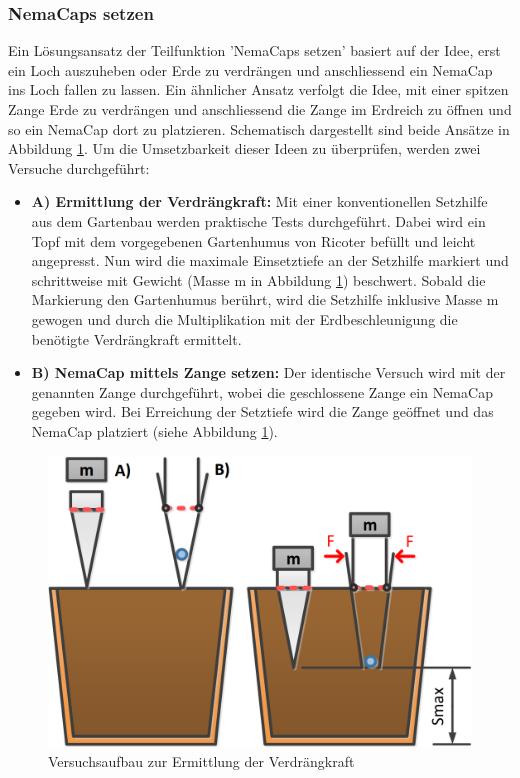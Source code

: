 \subsubsection{NemaCaps setzen}
Ein Lösungsansatz der Teilfunktion 'NemaCaps setzen' basiert auf der Idee, erst ein Loch auszuheben oder Erde zu verdrängen und anschliessend ein NemaCap ins Loch fallen zu lassen. Ein ähnlicher Ansatz verfolgt die Idee, mit einer spitzen Zange Erde zu verdrängen und anschliessend die Zange im Erdreich zu öffnen und so ein NemaCap dort zu platzieren. Schematisch dargestellt sind beide Ansätze in Abbildung \ref{fig:skizze_setzversuch}.
\newline
Um die Umsetzbarkeit dieser Ideen zu überprüfen, werden zwei Versuche durchgeführt:
\begin{itemize}
	\item \textbf{A) Ermittlung der Verdrängkraft:} Mit einer konventionellen Setzhilfe aus dem Gartenbau werden praktische Tests durchgeführt. Dabei wird ein Topf mit dem vorgegebenen Gartenhumus von Ricoter befüllt und leicht angepresst. Nun wird die maximale Einsetztiefe an der Setzhilfe markiert und schrittweise mit Gewicht (Masse m in Abbildung \ref{fig:skizze_setzversuch}) beschwert. Sobald die Markierung den Gartenhumus berührt, wird die Setzhilfe inklusive Masse m gewogen und durch die Multiplikation mit der Erdbeschleunigung die benötigte Verdrängkraft ermittelt.
	
	\item \textbf{B) NemaCap mittels Zange setzen:} Der identische Versuch wird mit der genannten Zange durchgeführt, wobei die geschlossene Zange ein NemaCap gegeben wird. Bei Erreichung der Setztiefe wird die Zange geöffnet und das NemaCap platziert (siehe Abbildung \ref{fig:skizze_setzversuch}).
\end{itemize} 

\begin{figure}[H]
	\includegraphics[width=1\textwidth]{Illustrationen/5-Konzept/skizze_stechversuch.PNG}
	\caption{Versuchsaufbau zur Ermittlung der Verdrängkraft}
	\label{fig:skizze_setzversuch}
\end{figure}

